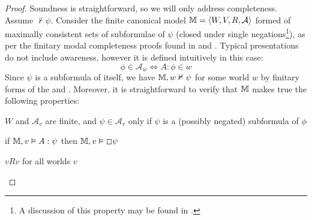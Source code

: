 \begin{proof}
  Soundness is straightforward, so we will only address completeness.  Assume
  $\nvdash \psi$.  Consider the finite canonical model $\mathbbm{M}= \langle
  W, V, R, \mathcal{A} \rangle$ formed of maximally consistent sets of
  subformulae of $\psi$ (closed under single negations{\footnote{A discussion
  of this property may be found in {\cite[pg.
  243]{blackburn_modal_2001}}.}}), as per the finitary modal completeness
  proofs found in {\cite[chapter 4.8]{blackburn_modal_2001}} and
  {\cite[chapter 5]{boolos_logic_1995}}.  Typical presentations do not
  include awareness, however it is defined intuitively in this case:
  \[ \phi \in \mathcal{A}_w \Longleftrightarrow A : \phi \in w \]
  Since $\psi$ is a subformula of itself, we have $\mathbbm{M}, w \nvDash
  \psi$ for some world $w$ by finitary forms of the {} and
  {}.  Moreover, it is straightforward to verify that
  $\mathbbm{M}$ makes true the following properties:
  \begin{enumeratenumeric}
    \item $W$ and $\mathcal{A}_v$ are finite, and $\psi \in \mathcal{A}_v$
    only if $\psi$ is a (possibly negated) subformula of $\phi$
    \item \label{awareness0-prop2} if $\mathbbm{M}, v \vDash A : \psi$ then $\mathbbm{M}, v \vDash \Box
    \psi$ 
    \item $v R v$ for all worlds $v$
  \end{enumeratenumeric}
  
  
  
    

\end{proof}
